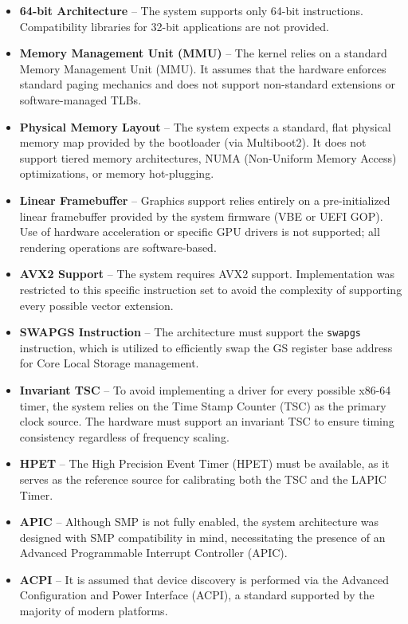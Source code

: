 \documentclass[a4paper,10pt,twoside]{report}
\theoremstyle{definition}
\begin{document}
\begin{itemize} 
    \item \textbf{64-bit Architecture} -- The system supports only 64-bit instructions. Compatibility libraries for 32-bit applications are not provided.
    \item \textbf{Memory Management Unit (MMU)} -- The kernel relies on a standard Memory Management Unit (MMU). It assumes that the hardware enforces standard paging mechanics and does not support non-standard extensions or software-managed TLBs.
    \item \textbf{Physical Memory Layout} -- The system expects a standard, flat physical memory map provided by the bootloader (via Multiboot2). It does not support tiered memory architectures, NUMA (Non-Uniform Memory Access) optimizations, or memory hot-plugging.
    \item \textbf{Linear Framebuffer} -- Graphics support relies entirely on a pre-initialized linear framebuffer provided by the system firmware (VBE or UEFI GOP). Use of hardware acceleration or specific GPU drivers is not supported; all rendering operations are software-based.
    \item \textbf{AVX2 Support} -- The system requires AVX2 support. Implementation was restricted to this specific instruction set to avoid the complexity of supporting every possible vector extension. 
    \item \textbf{SWAPGS Instruction} -- The architecture must support the \texttt{swapgs} instruction, which is utilized to efficiently swap the GS register base address for Core Local Storage management. 
    \item \textbf{Invariant TSC} -- To avoid implementing a driver for every possible x86-64 timer, the system relies on the Time Stamp Counter (TSC) as the primary clock source. The hardware must support an invariant TSC to ensure timing consistency regardless of frequency scaling.
    \item \textbf{HPET} -- The High Precision Event Timer (HPET) must be available, as it serves as the reference source for calibrating both the TSC and the LAPIC Timer. 
    \item \textbf{APIC} -- Although SMP is not fully enabled, the system architecture was designed with SMP compatibility in mind, necessitating the presence of an Advanced Programmable Interrupt Controller (APIC). 
    \item \textbf{ACPI} -- It is assumed that device discovery is performed via the Advanced Configuration and Power Interface (ACPI), a standard supported by the majority of modern platforms. 

\end{itemize}
\end{document}
